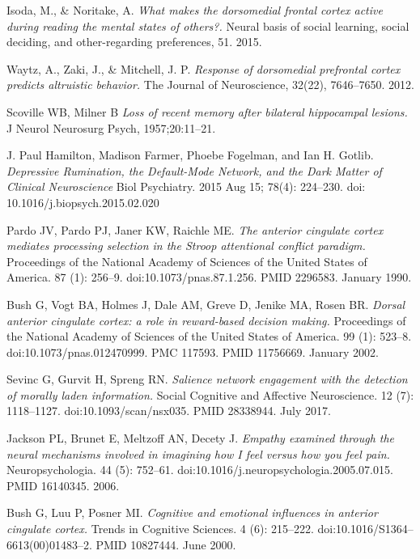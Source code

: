 \documentclass[a4paper, amsfonts, amssymb, amsmath, reprint, showkeys, nofootinbib, twoside]{revtex4-1}
\begin{document}
\begin{thebibliography}{99}
  Isoda, M., \& Noritake, A.
  \textit{What makes the dorsomedial frontal cortex active
    during reading the mental states of others?.}
  Neural basis of social learning, social deciding, and other-regarding preferences,
  51. 2015.

  Waytz, A., Zaki, J., \& Mitchell, J. P.
  \textit{Response of dorsomedial prefrontal cortex predicts altruistic behavior.}
  The Journal of Neuroscience, 32(22), 7646–7650. 2012.

 Scoville WB, Milner B
 \textit{Loss of recent memory after bilateral hippocampal lesions.}
 J Neurol Neurosurg Psych,  1957;20:11–21.

  J. Paul Hamilton, Madison Farmer, Phoebe Fogelman, and Ian H. Gotlib.
  \textit{Depressive Rumination, the Default-Mode Network,
          and the Dark Matter of Clinical Neuroscience}
  Biol Psychiatry. 2015 Aug 15; 78(4): 224–230. doi: 10.1016/j.biopsych.2015.02.020

  Pardo JV, Pardo PJ, Janer KW, Raichle ME.
  \textit{The anterior cingulate cortex mediates processing selection in the Stroop
    attentional conflict paradigm.}
  Proceedings of the National Academy of Sciences of the United States of
  America. 87 (1): 256–9. doi:10.1073/pnas.87.1.256. PMID 2296583. January 1990.

  Bush G, Vogt BA, Holmes J, Dale AM, Greve D, Jenike MA, Rosen BR.
  \textit{Dorsal anterior cingulate cortex: a role in reward-based decision making.}
  Proceedings of the National Academy of Sciences of the United States of
  America. 99 (1): 523–8. doi:10.1073/pnas.012470999. PMC 117593. PMID
  11756669. January 2002.

  Sevinc G, Gurvit H, Spreng RN.
  \textit{Salience network engagement with the detection of morally laden
    information.}
  Social Cognitive and Affective Neuroscience. 12 (7):
  1118–1127. doi:10.1093/scan/nsx035. PMID 28338944. July 2017.

  Jackson PL, Brunet E, Meltzoff AN, Decety J.
  \textit{Empathy examined through the neural mechanisms involved in imagining how I
    feel versus how you feel pain.}
  Neuropsychologia. 44 (5): 752–61. doi:10.1016/j.neuropsychologia.2005.07.015. PMID
  16140345. 2006.

  Bush G, Luu P, Posner MI.
  \textit{Cognitive and emotional influences in anterior cingulate cortex.}
  Trends in Cognitive Sciences. 4 (6):
  215–222. doi:10.1016/S1364–6613(00)01483–2. PMID 10827444. June 2000.


\end{thebibliography}
\end{document}
